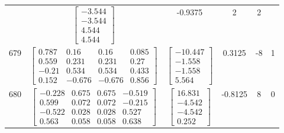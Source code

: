\documentclass[a4paper,12pt]{article}
\begin{document}
\begin{tabular}{c c c c c c}
&
$\begin{bmatrix} -3.544 \\ -3.544 \\ 4.544 \\ 4.544 \end{bmatrix}$
&
-0.9375
&
2
&
2
\\
679
&
$\begin{bmatrix} 0.787 & 0.16 & 0.16 & 0.085 \\ 0.559 & 0.231 & 0.231 & 0.27 \\ -0.21 & 0.534 & 0.534 & 0.433 \\ 0.152 & -0.676 & -0.676 & 0.856 \end{bmatrix}$
&
$\begin{bmatrix} -10.447 \\ -1.558 \\ -1.558 \\ 5.564 \end{bmatrix}$
&
0.3125
&
-8
&
1
\\
680
&
$\begin{bmatrix} -0.228 & 0.675 & 0.675 & -0.519 \\ 0.599 & 0.072 & 0.072 & -0.215 \\ -0.522 & 0.028 & 0.028 & 0.527 \\ 0.563 & 0.058 & 0.058 & 0.638 \end{bmatrix}$
&
$\begin{bmatrix} 16.831 \\ -4.542 \\ -4.542 \\ 0.252 \end{bmatrix}$
&
-0.8125
&
8
&
0
\\
\end{tabular} \egroup \newpage
\end{document}
